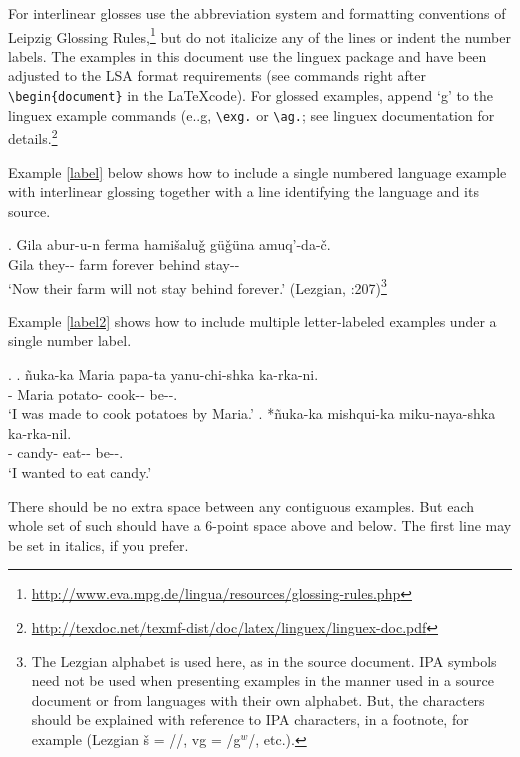 \documentclass[12pt,letterpaper]{article}
\begin{document}
 For interlinear glosses use the abbreviation system and formatting conventions of Leipzig Glossing Rules,\footnote{\url{http://www.eva.mpg.de/lingua/resources/glossing-rules.php}} but do not italicize any of the lines or indent the number labels. The examples in this document use the linguex package and have been adjusted to the LSA format requirements (see commands right after \verb=\begin{document}= in the \LaTeX code). For glossed examples, append `g' to the linguex example commands (e..g, \verb=\exg.= or \verb=\ag.=; see linguex documentation for details.\footnote{\url{http://texdoc.net/texmf-dist/doc/latex/linguex/linguex-doc.pdf}}

Example \ref{label} below shows how to include a single numbered language example with interlinear glossing together with a line identifying the language and its source.

\exg. Gila	abur-u-n	ferma	hamišaluǧ g\"uǧ\"una	amuq’-da-č.\\
Gila	they-\Obl{}-\Gen{}	farm	forever	behind	stay-\Fut{}-\Neg{}\\
`Now their farm will not stay behind forever.' \hfill (Lezgian, \citet{haspelmath93}:207)\footnote{The Lezgian alphabet is used here, as in the source document. IPA symbols need not be used when presenting examples in the manner used in a source document or from languages with their own alphabet. But, the characters should be explained with reference to IPA characters, in a footnote, for example (Lezgian \v{s} =  //, v{g} = /g$^w$/, etc.).}\label{label}


Example  \ref{label2} shows how to include multiple letter-labeled examples under a single number label.

\ex. \label{label2}
\ag. \~{n}uka-ka	Maria papa-ta	yanu-chi-shka	ka-rka-ni.\\
\Fsg{}-\Top{}	Maria	potato-\Acc{}	cook-\Caus{}-\Pass{}	be-\Pst{}-\Fsg{}. \\
`I was made to cook potatoes by Maria.'
\bg. *ñuka-ka	mishqui-ka	miku-naya-shka	ka-rka-nil.\\
\Fsg{}-\Top{}	candy-\Top{}	eat--\Pass{}	be-\Pst{}-\Fsg{}.\\
`I wanted to eat candy.' 

There should be no extra space between any contiguous examples. But each whole set of such should have a 6-point space above and below. The first line may be set in italics, if you prefer.
\end{document}
